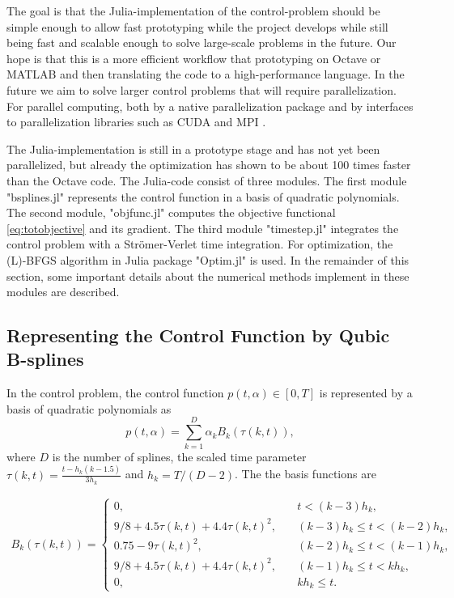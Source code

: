 \documentclass[11pt]{article}
\begin{document}
The goal is that the Julia-implementation of the control-problem should be simple enough to allow fast prototyping while the project develops while still being fast and scalable enough to solve large-scale problems in the future. Our hope is that this is a more efficient workflow that prototyping on Octave or MATLAB and then translating the code to a high-performance language. In the future we aim to solve larger control problems that will require parallelization.  For parallel computing, both by a native parallelization package and by interfaces to parallelization libraries such as CUDA \cite{CUDA} and MPI \cite{MPI}.

The Julia-implementation is still in a prototype stage and has not yet been parallelized, but already the optimization has shown to be about 100 times faster than the Octave code. The Julia-code consist of three modules. The first module "bsplines.jl" represents the control function in a basis of quadratic polynomials. The second module, "objfunc.jl" computes the objective functional \ref{eq:totobjective} and its gradient. The third module "timestep.jl" integrates the control problem with a Str\"omer-Verlet time integration. For optimization, the (L)-BFGS algorithm in Julia package "Optim.jl" is used. In the remainder of this section, some important details about the numerical methods implement in these modules are described.


\subsection{Representing the Control Function by Qubic B-splines}
In the control problem, the control function $p(t,\alpha) \in [0, T]$ is represented by a basis of quadratic polynomials as
%
\begin{equation}\label{eq:control_splines}
p(t,\alpha) = \sum_{k = 1}^D \alpha_k B_k(\tau(k,t)), 
\end{equation}
%
where $D$ is the number of splines, the scaled time parameter $\tau(k,t) = \frac{t- h_{k}(k-1.5)}{3h_{k}}$ and $h_{k} = T/(D-2)$. The the basis functions are

\begin{align}\label{eq:splinebasis}
B_k(\tau(k,t)) = 
\begin{cases} 
0, \quad &t < (k - 3)h_k, \\
9/8 + 4.5 \tau(k,t) + 4.4 \tau(k,t)^2, \quad &(k - 3)h_k \leq t < (k - 2)h_k, \\
0.75 - 9 \tau(k,t)^2, \quad  &(k-2)h_k \leq t <  (k-1)h_k, \\
9/8 + 4.5 \tau(k,t) + 4.4 \tau(k,t)^2, \quad &(k-1)h_k \leq t < kh_k,\\
0, \quad &kh_k\leq t. 
\end{cases}
\end{align}
\end{document}
